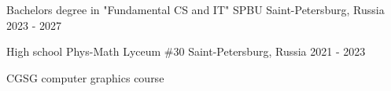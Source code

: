 

\begin{cventries}

  \cventry
    {Bachelors degree in "Fundamental CS and IT"} %
    {SPBU} %
    {Saint-Petersburg, Russia} %
    {2023 - 2027} %
    {
    }

  \cventry
    {High school} %
    {Phys-Math Lyceum \#30} %
    {Saint-Petersburg, Russia} %
    {2021 - 2023} %
    {
      \begin{cvitems} %
        \item {CGSG computer graphics course}
      \end{cvitems}
    }

\end{cventries}
